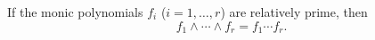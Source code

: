 If the monic polynomials $f_i$ ($i = 1, \ldots, r$) are relatively prime, then
$$f_1 \wedge \cdots \wedge f_r = f_1 \cdots f_r.$$

